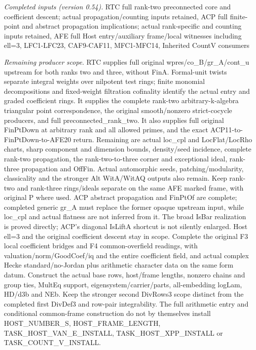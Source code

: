 \emph{Completed inputs (version 0.54).} RTC full rank-two preconnected core and coefficient descent; actual propagation/counting inputs retained, ACP full finite-point and abstract propagation implications; actual rank-specific and counting inputs retained, AFE full Host entry/auxiliary frame/local witnesses including ell=3, LFC1-LFC23, CAF9-CAF11, MFC1-MFC14, Inherited CountV consumers

\emph{Remaining producer scope.} RTC supplies full original wpres/co\_\allowbreak B/gr\_\allowbreak A/cont\_\allowbreak u upstream for both ranks two and three, without FinA. Formal-unit twists separate integral weights over nilpotent test rings; finite monomial decompositions and fixed-weight filtration cofinality identify the actual entry and graded coefficient rings. It supplies the complete rank-two arbitrary-k-algebra triangular point correspondence, the original smooth/nonzero strict-cocycle producers, and full preconnected\_\allowbreak rank\_\allowbreak two. It also supplies full original FinPtDown at arbitrary rank and all allowed primes, and the exact ACP11-to-FinPtDown-to-AFE20 return. Remaining are actual loc\_\allowbreak cpl and LocFlat/LocRho charts, sharp component and dimension bounds, density/seed incidence, complete rank-two propagation, the rank-two-to-three corner and exceptional ideal, rank-three propagation and OffFin. Actual automorphic seeds, patching/modularity, classicality and the stronger Alt WitA/WitAQ outputs also remain. Keep rank-two and rank-three rings/ideals separate on the same AFE marked frame, with original P where used. ACP abstract propagation and FinPtOf are complete; completed generic gr\_\allowbreak A must replace the former opaque upstream input, while loc\_\allowbreak cpl and actual flatness are not inferred from it. The broad IsBar realization is proved directly; ACP’s diagonal IsLiftA shortcut is not silently enlarged. Host ell=3 and the original coefficient descent stay in scope. Complete the original F3 local coefficient bridges and F4 common-overfield readings, with valuation/norm/GoodCoef/iq and the entire coefficient field, and actual complex Hecke standard/no-Jordan plus arithmetic character data on the same form datum. Construct the actual base rows, host/frame lengths, nonzero chains and group ties, MultEq support, eigensystem/carrier/parts, all-embedding logLam, HD/d3b and NEb. Keep the stronger second DivRows3 scope distinct from the completed first DivDef3 and row-pair integrability. The full arithmetic entry and conditional common-frame construction do not by themselves install HOST\_\allowbreak NUMBER\_\allowbreak S, HOST\_\allowbreak FRAME\_\allowbreak LENGTH, TASK\_\allowbreak HOST\_\allowbreak VAN\_\allowbreak E\_\allowbreak INSTALL, TASK\_\allowbreak HOST\_\allowbreak XPP\_\allowbreak INSTALL or TASK\_\allowbreak COUNT\_\allowbreak V\_\allowbreak INSTALL.

